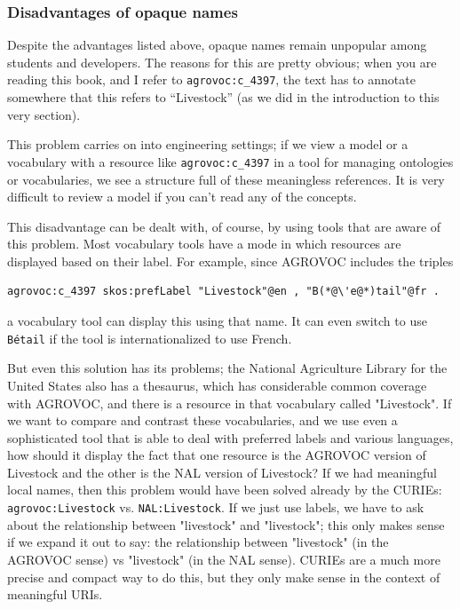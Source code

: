 \subsubsection{Disadvantages of opaque names}

Despite the advantages listed above, opaque names remain unpopular among students 
and developers.  The reasons for this are pretty obvious; when you are reading this 
book, and I refer to \texttt{agrovoc:c\_4397}, the text has to annotate somewhere that this
refers to ``Livestock'' (as we did in the introduction to this very section).   

This problem carries on into engineering settings; if we view a model or a vocabulary with 
a resource like \texttt{agrovoc:c\_4397} in a tool for managing ontologies or 
vocabularies, we see a structure full of these meaningless references.  It 
is very difficult to review a model if you can't read any of the concepts. 

This disadvantage can be dealt with, of course, by using tools that are aware of this 
problem.  Most vocabulary tools have a mode in which resources are displayed based on 
their label.  For example,  since AGROVOC includes the triples


\begin{lstlisting}
agrovoc:c_4397 skos:prefLabel "Livestock"@en , "B(*@\'e@*)tail"@fr .
\end{lstlisting}


a vocabulary tool can display this using that name.  It can even switch to use
\texttt{B\'etail} if the tool is internationalized to use French. 

But even this solution has its problems; the National Agriculture Library for the
United States also has a thesaurus, which has considerable common coverage with 
AGROVOC, and there is a resource in that vocabulary called "Livestock".  If 
we want to compare and contrast these vocabularies, and we use even a 
sophisticated  tool that 
is able to deal with preferred labels and various languages, how should it display the
fact that one resource is the AGROVOC version of Livestock and the other is
the NAL version of Livestock?  If we had meaningful local names, then this
problem would have been solved already by the CURIEs:  
\texttt{agrovoc:Livestock} vs. \texttt{NAL:Livestock}.  If we just use labels, 
we have to ask about the relationship between "livestock" and "livestock"; this only makes sense
if we expand it out to say: the relationship between "livestock" (in the AGROVOC sense) vs "livestock" 
(in the NAL sense).  CURIEs are a much more precise and compact way to do this, but they only make
sense in the context of meaningful URIs. 

